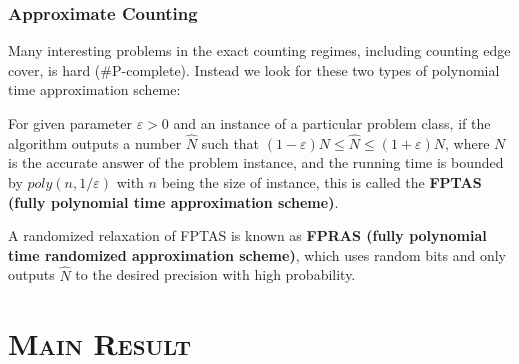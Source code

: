 \documentclass[mathserif]{beamer}
\newcommand{\eps}{\varepsilon}
\begin{document}
\begin{frame}
	\frametitle{Approximate Counting}
	Many interesting problems in the exact counting regimes, including counting edge cover, is hard (\#P-complete).
	Instead we look for these two types of polynomial time approximation scheme:
	\pause
	\begin{definition}[FPTAS]
		For given parameter $\eps > 0$ and an instance of a particular problem class, if the algorithm outputs a number $\hat{N}$ such that $(1-\eps) N \leq \hat{N} \leq (1+\eps) N$, where $N$ is the accurate answer of the problem instance, and the running time is bounded by $poly(n, 1/ \eps)$ with $n$ being the size of instance, this is called the {\bf FPTAS (fully polynomial time approximation scheme)}.

	\end{definition}
		A randomized relaxation of FPTAS is known as {\bf FPRAS (fully polynomial time randomized approximation scheme)}, which uses random bits and only outputs $\hat{N}$ to the desired precision with high probability.
\end{frame}

%	


\section{\scshape Main Result}
\end{document}

